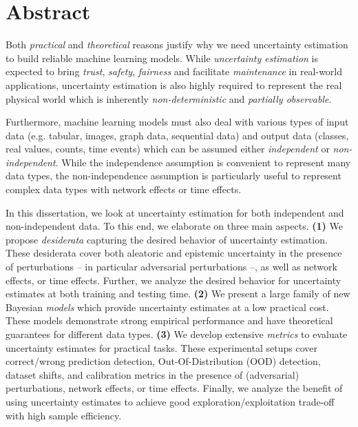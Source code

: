 \chapter*{Abstract}
%

Both \emph{practical} and \emph{theoretical} reasons justify why we need uncertainty estimation to build reliable machine learning models. While \emph{uncertainty estimation} is expected to bring \emph{trust}, \emph{safety}, \emph{fairness} and facilitate \emph{maintenance} in real-world applications, uncertainty estimation is also highly required to represent the real physical world which is inherently \emph{non-deterministic} and \emph{partially observable}. 

Furthermore, machine learning models must also deal with various types of input data (e.g. tabular, images, graph data, sequential data) and output data (classes, real values, counts, time events) which can be assumed either \emph{independent} or \emph{non-independent}. While the independence assumption is convenient to represent many data types, the non-independence assumption is particularly useful to represent complex data types with network effects or time effects.

In this dissertation, we look at uncertainty estimation for both independent and non-independent data. To this end, we elaborate on three main aspects. \textbf{(1)} We propose \emph{desiderata} capturing the desired behavior of uncertainty estimation. These desiderata cover both aleatoric and epistemic uncertainty in the presence of perturbations -- in particular adversarial perturbations --, as well as network effects, or time effects. Further, we analyze the desired behavior for uncertainty estimates at both training and testing time. \textbf{(2)} We present a large family of new Bayesian \emph{models} which provide uncertainty estimates at a low practical cost. These models demonstrate strong empirical performance and have theoretical guarantees for different data types. \textbf{(3)} We develop extensive \emph{metrics} to evaluate uncertainty estimates for practical tasks. These experimental setups cover correct/wrong prediction detection, Out-Of-Distribution (OOD) detection, dataset shifts, and calibration metrics in the presence of (adversarial) perturbations, network effects, or time effects. Finally, we analyze the benefit of using uncertainty estimates to achieve good exploration/exploitation trade-off with high sample efficiency.
